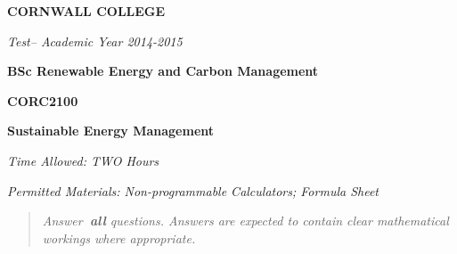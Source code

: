 \documentclass[a4paper,12pt,fleqn]{article}
\newcommand{\institution}{CORNWALL COLLEGE}
\newcommand{\titlehd}{BSc Renewable Energy and Carbon Management}
\newcommand{\examtype}{Test}
\newcommand{\examdate}{Academic Year 2014-2015}
\newcommand{\examcode}{CORC2100}
\newcommand{\examtitle}{Sustainable Energy Management}
\newcommand{\readtime}{15 Minutes}
\newcommand{\writetime}{TWO Hours}
\newcommand{\materials}{Non-programmable Calculators; Formula Sheet}
\begin{document}

\begin{center}
\large\textbf{\institution}
\end{center}
\vspace{1cm}

\begin{center}
\textit{ \examtype -- \examdate}
\end{center}
\vspace{1cm}

\begin{center}
\large\textbf{\titlehd}
\end{center}

\begin{center}
\large\textbf{\examcode}
\end{center}
\begin{center}
\large\textbf{\examtitle}
\end{center}
\vspace{4cm}
\vspace{4cm}

\begin{center}
\end{center}
\begin{center}
\textit{Time Allowed:  \writetime}
\end{center}
\begin{center}
\textit{Permitted Materials: \materials}
\end{center}





\newpage
\begin{quote}
\textit{Answer\textbf{\ all} questions.  Answers are expected to contain clear mathematical workings where appropriate.}
\end{quote}

\bigskip
\end{document}
